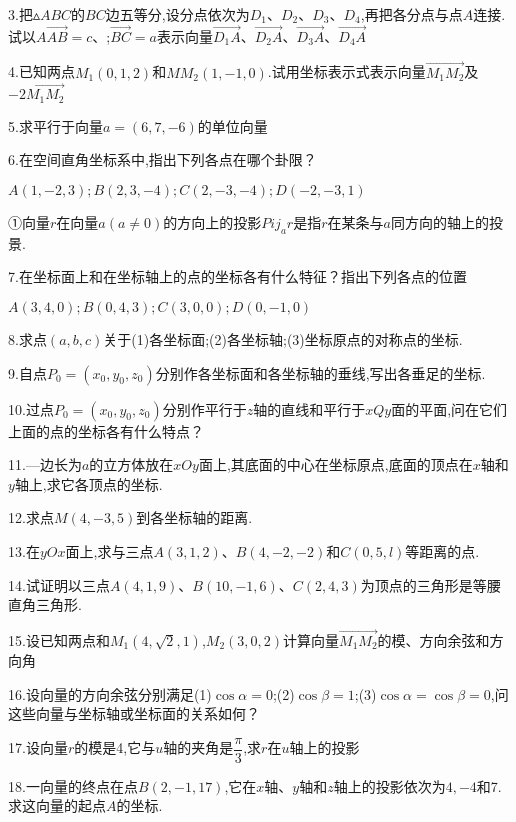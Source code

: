 \documentclass[oneside]{book}
\begin{document}
3.把$\vartriangle ABC$的$BC$边五等分,设分点依次为${D_1}$、${D_2}$、${D_3}$、${D_4}$,再把各分点与点$A$连接.试以$A\overrightarrow {AB}  = c$、;$\overrightarrow {BC}  = a$表示向量$\overrightarrow {{D_1}A} $、$\overrightarrow {{D_2}A} $、$\overrightarrow {{D_3}A} $、$\overrightarrow {{D_4}A} $

4.已知两点${M_1}(0,1,2)$和$M{M_2}(1, - 1,0)$.试用坐标表示式表示向量$\overrightarrow {{M_1}{M_2}} $及$ - 2\overrightarrow {{M_1}{M_2}} $

5.求平行于向量$a=(6,7,-6)$的单位向量

6.在空间直角坐标系中,指出下列各点在哪个卦限？

$A(1, - 2,3);B(2,3, - 4);C(2, - 3, - 4);D( - 2, - 3,1)$

①向量$r$在向量$a(a \ne 0)$的方向上的投影$Pi{j_a}r$是指$r$在某条与$a$同方向的轴上的投景.

7.在坐标面上和在坐标轴上的点的坐标各有什么特征？指出下列各点的位置

$A\left( {3,4,0} \right);B\left( {0,4,3} \right);C\left( {3,0,0} \right);D\left( {0, - 1,0} \right)$

8.求点$(a,b,c)$关于(1)各坐标面;(2)各坐标轴;(3)坐标原点的对称点的坐标.

9.自点${P_0} = ({x_0},{y_0},{z_0})$分别作各坐标面和各坐标轴的垂线,写出各垂足的坐标.

10.过点${P_0} = ({x_0},{y_0},{z_0})$分别作平行于$z$轴的直线和平行于$xQy$面的平面,问在它们上面的点的坐标各有什么特点？

11.—边长为$a$的立方体放在$xOy$面上,其底面的中心在坐标原点,底面的顶点在$x$轴和$y$轴上,求它各顶点的坐标.

12.求点$M\left( {4, - 3,5} \right)$到各坐标轴的距离.

13.在$yOx$面上,求与三点$A(3,1,2)$、$B\left( {4, - 2, - 2} \right)$和$C\left( {0,5,l} \right)$等距离的点.

14.试证明以三点$A(4,1,9)$、$B(10,-1,6)$、$C(2,4,3)$为顶点的三角形是等腰直角三角形.

15.设已知两点和${M_1}\left( {4,\sqrt 2 ,1} \right)$,${M_2}\left( {3,0,2} \right)$计算向量$\overrightarrow {{M_1}{M_2}} $的模、方向余弦和方向角

16.设向量的方向余弦分别满足(1)$\cos \alpha  = 0$;(2)$\cos\beta  = 1$;(3)$\cos\alpha  = \cos\beta  = 0$,问这些向量与坐标轴或坐标面的关系如何？

17.设向量$r$的模是4,它与$u$轴的夹角是$\dfrac{\pi }{3}$,求$r$在$u$轴上的投影

18.一向量的终点在点$B(2,-1,17)$,它在$x$轴、$y$轴和$z$轴上的投影依次为$4,-4$和7.求这向量的起点$A$的坐标.
\end{document}
